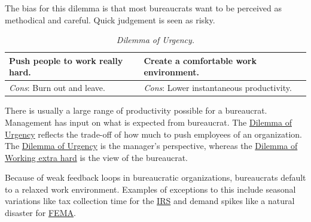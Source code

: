 The bias for this dilemma is that most bureaucrats want to be perceived as methodical and careful. Quick judgement is seen as risky. 


\begin{center}
\begin{table}[H] %
\begin{tabular}{ | m{\dilemmatablewidth}| m{\dilemmatablewidth} | } 
  \hline
  \textbf{Push people to work really hard.} & 
  \textbf{Create a comfortable work environment.} \\ 
  \hline
  \textit{Cons}: Burn out and leave. & 
  \textit{Cons}: Lower instantaneous productivity. \\  
  \hline
\end{tabular}
\caption{
\textit{Dilemma of Urgency.}
}
\label{table:dilemma-personal-manager-rate-of-work}
\end{table}
\end{center}

There is usually a large range of productivity possible for a bureaucrat. Management has input on what is expected from bureaucrat. The 
\hyperref[table:dilemma-personal-manager-rate-of-work]{Dilemma of Urgency} reflects the trade-off of how much to push employees of an organization. The \hyperref[table:dilemma-personal-manager-rate-of-work]{Dilemma of Urgency} is the manager's perspective, whereas the
\hyperref[table:dilemma-personal-work-extra-or-work-as-expected]{Dilemma of Working extra hard}
is the view of the bureaucrat. 


Because of weak feedback loops in bureaucratic organizations, bureaucrats default to a relaxed work environment. Examples of exceptions to this include seasonal variations like tax collection time for the \href{https://en.wikipedia.org/wiki/Internal_Revenue_Service}{IRS} 
and demand spikes like a natural disaster for \href{https://en.wikipedia.org/wiki/Federal_Emergency_Management_Agency}{FEMA}. 

